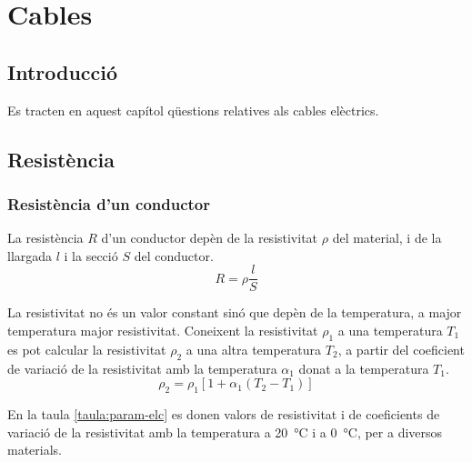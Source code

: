 
\chapter{Cables}\label{sec:ch-cables}

\section{Introducció}
Es tracten en aquest capítol qüestions relatives als cables elèctrics.

\section{Resistència}

\subsection{Resistència d'un conductor}

La resistència $R$ d'un conductor depèn de la resistivitat $\rho$
del material, i de la llargada $l$ i  la secció
$S$  del conductor.
\begin{equation}
   R= \rho \frac{l}{S}
\end{equation}
\index{$\rho$}

La resistivitat no
és un valor constant sinó que depèn de la temperatura, a major
temperatura major resistivitat. Coneixent la resistivitat $\rho_1$ a una
temperatura $T_1$ es pot calcular la resistivitat $\rho_2$ a una altra
temperatura $T_2$, a partir del coeficient de variació de la
resistivitat amb la temperatura $\alpha_1$ donat a la temperatura $T_1$.
\begin{equation}
   \rho_2 = \rho_1 [1 + \alpha_1 (T_2 - T_1)]\label{eq:resistivitat}
\end{equation}
\index{$\alpha$}

En la taula
\vref{taula:param-elc} es donen valors de resistivitat i de
coeficients de variació de la resistivitat amb la temperatura a
\qty{20}{\degreeCelsius} i a \qty{0}{\degreeCelsius}, per a diversos materials.

